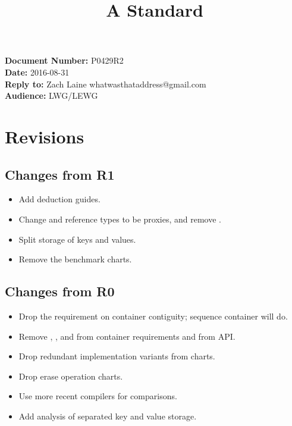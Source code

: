 \documentclass{article}
\begin{document}
\title{\textbf{\Large A Standard }}
\date{}
{\let\newpage\relax\maketitle}

\noindent\textbf{Document Number:} P0429R2\\
\textbf{Date:} 2016-08-31\\
\textbf{Reply to:} Zach Laine whatwasthataddress@gmail.com\\
\textbf{Audience:} LWG/LEWG

\section{Revisions}

\label{sec:revisions}

\subsection{Changes from R1}

\begin{itemize}
  \item Add deduction guides.
  \item Change  and reference types to be proxies, and remove
    .
  \item Split storage of keys and values.
  \item Remove the benchmark charts.
\end{itemize}

\subsection{Changes from R0}

\begin{itemize}
  \item Drop the requirement on container contiguity; sequence container will
    do.
  \item Remove , , and 
    from container requirements and from  API.
  \item Drop redundant implementation variants from charts.
  \item Drop erase operation charts.
  \item Use more recent compilers for comparisons.
  \item Add analysis of separated key and value storage.
\end{itemize}
\end{document}
